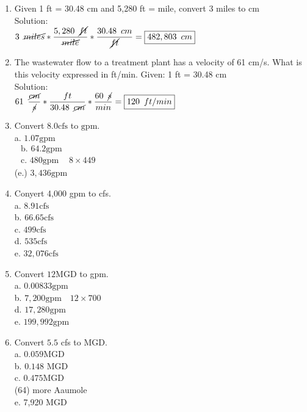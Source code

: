 \documentclass{article}
\begin{document}
\begin{enumerate}
\item Given 1 ft = 30.48 cm and 5,280 ft = mile, convert 3 miles to cm\\
Solution:\\
$3 \enspace \cancel{miles} * \dfrac{5,280 \enspace \cancel{ft}}{\cancel{mile}}*\dfrac{30.48 \enspace cm}{\cancel{ft}}=\boxed{482,803 \enspace cm}$

\item The wastewater flow to a treatment plant has a velocity of 61 cm/s. What is this velocity expressed in ft/min. Given: 1 ft = 30.48 cm\\
Solution:\\
$61 \enspace \dfrac{\cancel{cm}}{\cancel{s}} * \dfrac{ft}{30.48 \enspace \cancel{cm}}* \dfrac{60 \enspace \cancel{s}}{min} =  \boxed{120 \enspace ft/min}$\\

\item Convert $8.0 \mathrm{cfs}$ to $\mathrm{gpm}$.\\
a. $1.07 \mathrm{gpm}$\\
$\begin{array}{ll}\text { b. } 64.2 \mathrm{gpm} \\ \text { c. } 480 \mathrm{gpm} & 8 \times 449\end{array}$\\
(e.) $3,436 \mathrm{gpm}$\\

\item Conyert 4,000 gpm to cfs.\\
a.  $8.91 \mathrm{cfs}$\\
b. $66.65 \mathrm{cfs}$\\
c. $499 \mathrm{cfs}$\\
d. $535 \mathrm{cfs}$\\
e. $32,076 \mathrm{cfs}$\\

\item Convert $12 \mathrm{MGD}$ to gpm.\\
a. $0.00833 \mathrm{gpm}$\\
b. $7,200 \mathrm{gpm} \quad 12 \times 700$\\
d. $17,280 \mathrm{gpm}$\\
e. $199,992 \mathrm{gpm}$\\

\item Convert $5.5$ cfs to MGD.\\
a. $0.059 \mathrm{MGD}$\\
b. $0.148$ MGD\\
c. $0.475 \mathrm{MGD}$\\
(64) more Aaumole\\
e. 7,920 MGD\\


\end{enumerate}
\end{document}
